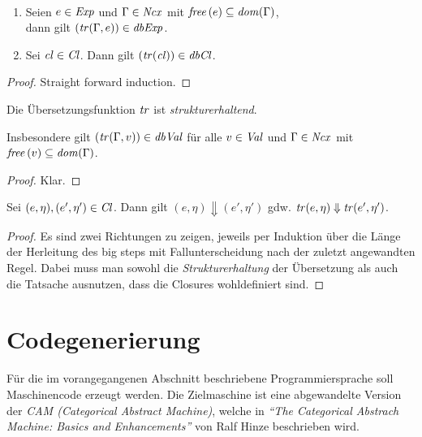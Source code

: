 \documentclass[12pt,fleqn]{article}
\newcommand{\Cl}{\name{Cl}}
\newcommand{\cl}{\name{cl}}
\begin{document}
\begin{lemma} \
  \begin{enumerate}
  \item Seien $e \in {\text{\it Exp\/}}$ und $\Gamma\in{\text{\it Ncx\/}}$ mit ${\text{\it free\/}}\,(e)\subseteq {\text{\it dom\/}}(\Gamma)$, \\
    dann gilt $({\text{\it tr\/}}(\Gamma,e))\in{\text{\it dbExp\/}}$.
  \item Sei $\cl\in\Cl$. Dann gilt $(\tr{\cl})\in\dbCl$.
  \end{enumerate}
\end{lemma}

\begin{proof}
  Straight forward induction.
\end{proof}

\begin{lemma}
  Die \"Ubersetzungsfunktion ${\text{\it tr\/}}$ ist {\em strukturerhaltend}.
\end{lemma}

Insbesondere gilt $({\text{\it tr\/}}(\Gamma,v))\in{\text{\it dbVal\/}}$ f\"ur alle $v\in{\text{\it Val\/}}$ und $\Gamma\in{\text{\it Ncx\/}}$ mit
${\text{\it free\/}}\,(v)\subseteq{\text{\it dom\/}}(\Gamma)$.

\begin{proof}
  Klar.
\end{proof}

\begin{theorem}[\"Aquivalenzsatz]
  Sei $(e,\eta),(e',\eta')\in\Cl$. Dann gilt $(e,\eta) \Downarrow (e',\eta')$ gdw.
  ${\text{\it tr\/}}(e,\eta) \Downarrow {\text{\it tr\/}}(e',\eta')$.
\end{theorem}

\begin{proof}
  Es sind zwei Richtungen zu zeigen, jeweils per Induktion \"uber die L\"ange der Herleitung des big steps mit
  Fallunterscheidung nach der zuletzt angewandten Regel. Dabei muss man sowohl die {\em Strukturerhaltung} der
  \"Ubersetzung als auch die Tatsache ausnutzen, dass die Closures wohldefiniert sind.
\end{proof}


\section{Codegenerierung}

F\"ur die im vorangegangenen Abschnitt beschriebene Programmiersprache soll Maschinencode erzeugt werden. Die
Zielmaschine ist eine abgewandelte Version der {\em CAM (Categorical Abstract Machine)}, welche in {\em ``The
Categorical Abstrach Machine: Basics and Enhancements''} von Ralf Hinze beschrieben wird.
\end{document}
